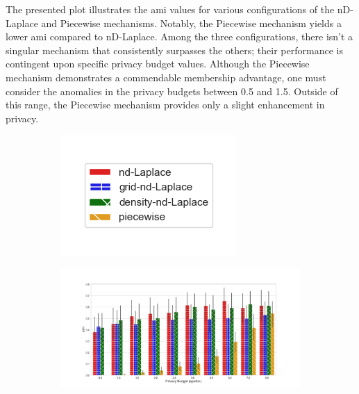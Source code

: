 The presented plot illustrates the \gls{ami} values for various configurations of the nD-Laplace and Piecewise mechanisms. Notably, the Piecewise mechanism yields a lower \gls{ami} compared to nD-Laplace. Among the three configurations, there isn't a singular mechanism that consistently surpasses the others; their performance is contingent upon specific privacy budget values. Although the Piecewise mechanism demonstrates a commendable membership advantage, one must consider the anomalies in the privacy budgets between 0.5 and 1.5. Outside of this range, the Piecewise mechanism provides only a slight enhancement in privacy.
\newpage


\begin{figure}[H]
  \centering
  \begin{subfigure}{0.30\textwidth}
    \includegraphics[width=\textwidth]{Results/nd-laplace/ami_bar_comparison_legend.png}
  \end{subfigure}
  \begin{subfigure}{1\textwidth}
    \includegraphics[width=1\textwidth]{Results/nd-laplace/ami_heart-dataset_comparison.png}

\end{subfigure}
\end{figure}
